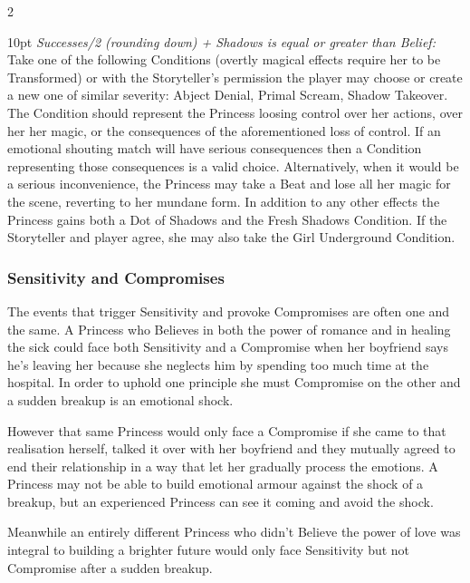 \begin{multicols}{2}
\begin{myindentpar}{10pt}
\emph{Successes/2 (rounding down) + Shadows is equal or greater than Belief:} Take one of the following Conditions (overtly magical effects require her to be Transformed) or with the Storyteller's permission the player may choose or create a new one of similar severity: Abject Denial, Primal Scream, Shadow Takeover. The Condition should represent the Princess loosing control over her actions, over her her magic, or the consequences of the aforementioned loss of control. If an emotional shouting match will have serious consequences then a Condition representing those consequences is a valid choice. Alternatively, when it would be a serious inconvenience, the Princess may take a Beat and lose all her magic for the scene, reverting to her mundane form. In addition to any other effects the Princess gains both a Dot of Shadows and the Fresh Shadows Condition. If the Storyteller and player agree, she may also take the Girl Underground Condition. 

\end{myindentpar}

\begin{mybox}



\subsubsection*{Sensitivity and Compromises}

The events that trigger Sensitivity and provoke Compromises are often one and the same. A Princess who Believes in both the power of romance and in healing the sick could face both Sensitivity and a Compromise when her boyfriend says he's leaving her because she neglects him by spending too much time at the hospital. In order to uphold one principle she must Compromise on the other and a sudden breakup is an emotional shock.

However that same Princess would only face a Compromise if she came to that realisation herself, talked it over with her boyfriend and they mutually agreed to end their relationship in a way that let her gradually process the emotions. A Princess may not be able to build emotional armour against the shock of a breakup, but an experienced Princess can see it coming and avoid the shock. 

Meanwhile an entirely different Princess who didn't Believe the power of love was integral to building a brighter future would only face Sensitivity but not Compromise after a sudden breakup.


\end{mybox}
\end{multicols}
